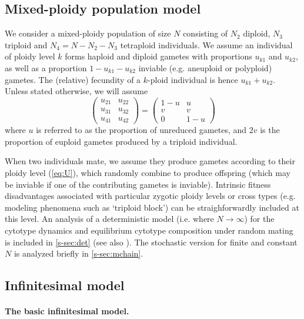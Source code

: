 \documentclass[unnumsec,webpdf,modern,large]{_oup-authoring-template}
\theoremstyle{thmstyleone}%
\theoremstyle{thmstyletwo}%
\theoremstyle{thmstylethree}%
\begin{document}
\subsection*{Mixed-ploidy population model}

We consider a mixed-ploidy population of size $N$ consisting of $N_2$ diploid,
$N_3$ triploid and $N_4=N-N_2-N_3$ tetraploid individuals.
We assume an individual of ploidy level $k$ forms haploid and diploid gametes
with proportions $u_{k1}$ and $u_{k2}$, as well as a proportion
$1-u_{k1}-u_{k2}$ inviable (e.g. aneuploid or polyploid) gametes.
The (relative) fecundity of a $k$-ploid individual is hence $u_{k1} + u_{k2}$.
Unless stated otherwise, we will assume 
\begin{equation}
    \begin{pmatrix} 
    u_{21} & u_{22} \\ 
    u_{31} & u_{32} \\ 
    u_{41} & u_{42} 
    \end{pmatrix} =
    \begin{pmatrix} 
    1-u & u \\
    v & v \\
    0 & 1-u
    \end{pmatrix} \label{eq:U}
\end{equation}
where $u$ is referred to as the proportion of unreduced gametes, and $2v$ is
the proportion of euploid gametes produced by a triploid individual.

When two individuals mate, we assume they produce gametes according to their
ploidy level (\cref{eq:U}), which randomly combine to produce offspring (which
may be inviable if one of the contributing gametes is inviable).
Intrinsic fitness disadvantages associated with particular zygotic ploidy
levels or cross types (e.g. modeling phenomena such as `triploid block') can be
straighforwardly included at this level.
An analysis of a deterministic model (i.e. where $N \rightarrow \infty$) for
the cytotype dynamics and equilibrium cytotype composition under random mating
is included in \cref{s-sec:det} (see also \cite{felber1997,kauai2024}).
The stochastic version for finite and constant $N$ is analyzed briefly in
\cref{s-sec:mchain}.

\subsection*{Infinitesimal model}

\paragraph*{The basic infinitesimal model.}
\end{document}
